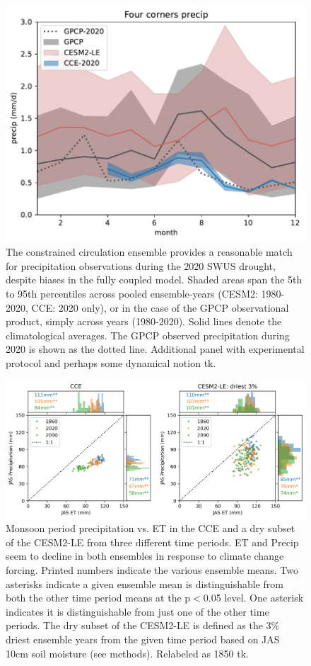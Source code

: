 \documentclass[draft]{agujournal2019}
\begin{document}
\begin{figure}
\includegraphics[width=30pc]{../figs/main/precip.pdf}
\caption{The constrained circulation ensemble provides a reasonable match for precipitation observations during the 2020 SWUS drought, despite  biases in the fully coupled model. Shaded areas span the 5th to 95th percentiles across pooled ensemble-years (CESM2: 1980-2020, CCE: 2020 only), or in the case of the GPCP observational product, simply across years (1980-2020). Solid lines denote the climatological averages. The GPCP observed precipitation during 2020 is shown as the dotted line. Additional panel with experimental protocol and perhaps some dynamical notion tk.}
\end{figure}

\begin{figure}
\includegraphics[width=40pc]{../figs/main/scatter_ET_P.png}
\caption{Monsoon period precipitation vs. ET in the CCE and a dry subset of the CESM2-LE from three different time periods. ET and Precip seem to decline in both ensembles in response to climate change forcing. Printed numbers indicate the various ensemble means. Two asterisks indicate a given ensemble mean is distinguishable from both the other time period means at the p$<$0.05 level. One asterisk indicates it is distinguishable from just one of the other time periods. The dry subset of the CESM2-LE is defined as the 3\% driest ensemble years from the given time period based on JAS 10cm soil moisture (see methods). Relabeled as 1850 tk.}
\end{figure}
\end{document}
